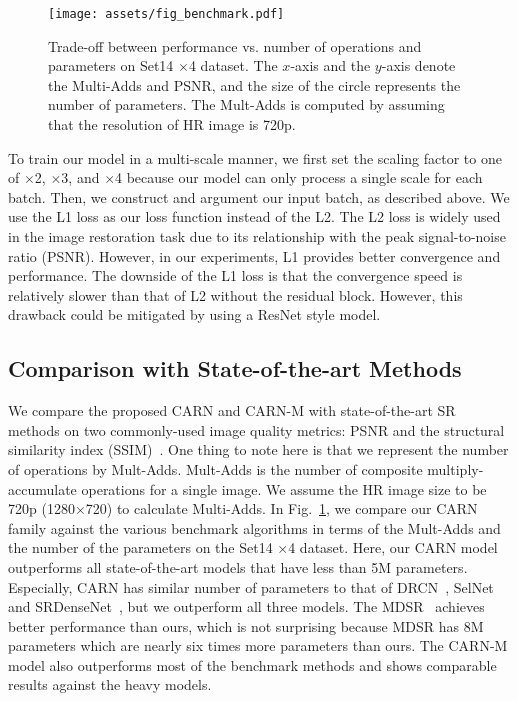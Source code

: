 \documentclass[runningheads]{llncs}
\begin{document}
\begin{figure}[t]
    \centering
    \texttt{[image: assets/fig\_benchmark.pdf]}
    \caption{Trade-off between performance vs. number of operations and parameters on Set14 $\times$4 dataset. The $x$-axis and the $y$-axis denote the Multi-Adds and PSNR, and the size of the circle represents the number of parameters. The Mult-Adds is computed by assuming that the resolution of HR image is 720p.}
    \label{fig:benchmark}
\end{figure}

To train our model in a multi-scale manner, we first set the scaling factor to one of $\times$2, $\times$3, and $\times$4 because our model can only process a single scale for each batch. Then, we construct and argument our input batch, as described above. We use the L1 loss as our loss function instead of the L2. The L2 loss is widely used in the image restoration task due to its relationship with the peak signal-to-noise ratio (PSNR). However, in our experiments, L1 provides better convergence and performance. The downside of the L1 loss is that the convergence speed is relatively slower than that of L2 without the residual block. However, this drawback could be mitigated by using a ResNet style model.

\subsection{Comparison with State-of-the-art Methods}
\label{subsec:comparison}
We compare the proposed CARN and CARN-M with state-of-the-art SR methods on two commonly-used image quality metrics: PSNR and the structural similarity index (SSIM)~\cite{ssim}. One thing to note here is that we represent the number of operations by Mult-Adds. Mult-Adds is the number of composite multiply-accumulate operations for a single image. We assume the HR image size to be 720p (1280$\times$720) to calculate Multi-Adds. In Fig.~\ref{fig:benchmark}, we compare our CARN family against the various benchmark algorithms in terms of the Mult-Adds and the number of the parameters on the Set14 $\times$4 dataset. Here, our CARN model outperforms all state-of-the-art models that have less than 5M parameters. Especially, CARN has similar number of parameters to that of DRCN~\cite{drcn2016}, SelNet~\cite{selnet} and SRDenseNet~\cite{srdense}, but we outperform all three models. The MDSR~\cite{mdsr2017} achieves better performance than ours, which is not surprising because MDSR has 8M parameters which are nearly six times more parameters than ours. The CARN-M model also outperforms most of the benchmark methods and shows comparable results against the heavy models.
\end{document}
